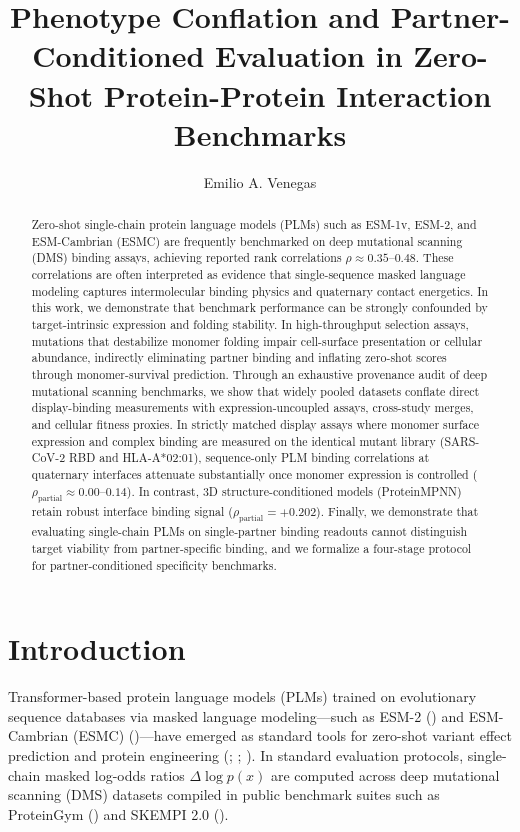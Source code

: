 \documentclass[
  11pt,
  us-letterpaper,
  DIV=11,
  numbers=noendperiod]{scrartcl}
\title{Phenotype Conflation and Partner-Conditioned Evaluation in
Zero-Shot Protein-Protein Interaction Benchmarks}
\author{Emilio A. Venegas}
\date{}
\begin{document}
\maketitle
\begin{abstract}
Zero-shot single-chain protein language models (PLMs) such as ESM-1v,
ESM-2, and ESM-Cambrian (ESMC) are frequently benchmarked on deep
mutational scanning (DMS) binding assays, achieving reported rank
correlations \(\rho \approx 0.35\text{--}0.48\). These correlations are
often interpreted as evidence that single-sequence masked language
modeling captures intermolecular binding physics and quaternary contact
energetics. In this work, we demonstrate that benchmark performance can
be strongly confounded by target-intrinsic expression and folding
stability. In high-throughput selection assays, mutations that
destabilize monomer folding impair cell-surface presentation or cellular
abundance, indirectly eliminating partner binding and inflating
zero-shot scores through monomer-survival prediction. Through an
exhaustive provenance audit of deep mutational scanning benchmarks, we
show that widely pooled datasets conflate direct display-binding
measurements with expression-uncoupled assays, cross-study merges, and
cellular fitness proxies. In strictly matched display assays where
monomer surface expression and complex binding are measured on the
identical mutant library (SARS-CoV-2 RBD and HLA-A*02:01), sequence-only
PLM binding correlations at quaternary interfaces attenuate
substantially once monomer expression is controlled
(\(\rho_{\text{partial}} \approx 0.00\text{--}0.14\)). In contrast, 3D
structure-conditioned models (ProteinMPNN) retain robust interface
binding signal (\(\rho_{\text{partial}} = +0.202\)). Finally, we
demonstrate that evaluating single-chain PLMs on single-partner binding
readouts cannot distinguish target viability from partner-specific
binding, and we formalize a four-stage protocol for partner-conditioned
specificity benchmarks.
\end{abstract}


\section{Introduction}\label{sec-intro}

Transformer-based protein language models (PLMs) trained on evolutionary
sequence databases via masked language modeling---such as ESM-2
() and ESM-Cambrian
(ESMC) ()---have
emerged as standard tools for zero-shot variant effect prediction and
protein engineering (; ;
). In standard
evaluation protocols, single-chain masked log-odds ratios
\(\Delta \log p(x)\) are computed across deep mutational scanning (DMS)
datasets compiled in public benchmark suites such as ProteinGym
() and SKEMPI 2.0
().
\end{document}
